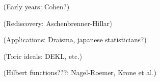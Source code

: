 (Early years: Cohen?)

(Rediscovery: Aschenbrenner-Hillar)

(Applications: Draisma, japanese statisticians?)

(Toric ideals: DEKL, etc.)

(Hilbert functions???: Nagel-Roemer, Krone et al.)
